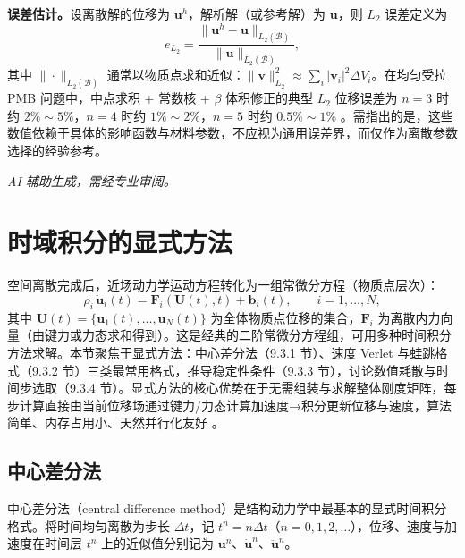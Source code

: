 \textbf{误差估计。}设离散解的位移为 $\mathbf{u}^{h}$，解析解（或参考解）为 $\mathbf{u}$，则 $L_2$ 误差定义为
\begin{equation}
  e_{L_2}=
  \frac{\|\mathbf{u}^{h}-\mathbf{u}\|_{L_2(\mathcal{B})}}
  {\|\mathbf{u}\|_{L_2(\mathcal{B})}},
  \label{eq:vol-l2-error}
\end{equation}
其中 $\|\cdot\|_{L_2(\mathcal{B})}$ 通常以物质点求和近似：$\|\mathbf{v}\|_{L_2}^2\approx\sum_i|\mathbf{v}_i|^2\Delta V_i$。在均匀受拉 PMB 问题中，中点求积 + 常数核 + $\beta$ 体积修正的典型 $L_2$ 位移误差为 $n=3$ 时约 $2\%\sim5\%$，$n=4$ 时约 $1\%\sim2\%$，$n=5$ 时约 $0.5\%\sim1\%$ \cite{SelesonLittlewood2016,LeBobaru2018}。需指出的是，这些数值依赖于具体的影响函数与材料参数，不应视为通用误差界，而仅作为离散参数选择的经验参考。

\emph{AI 辅助生成，需经专业审阅。}

\section{时域积分的显式方法}\label{sec:disc-explicit}

空间离散完成后，近场动力学运动方程转化为一组常微分方程（物质点层次）：
\begin{equation}
  \rho_i\,\ddot{\mathbf{u}}_i(t)=\mathbf{F}_i(\mathbf{U}(t),t)+\mathbf{b}_i(t),
  \qquad i=1,\dots,N,
  \label{eq:exp-semi-discrete}
\end{equation}
其中 $\mathbf{U}(t)=\{\mathbf{u}_1(t),\dots,\mathbf{u}_N(t)\}$ 为全体物质点位移的集合，$\mathbf{F}_i$ 为离散内力向量（由键力或力态求和得到）。这是经典的二阶常微分方程组，可用多种时间积分方法求解。本节聚焦于显式方法：中心差分法（9.3.1 节）、速度 Verlet 与蛙跳格式（9.3.2 节）三类最常用格式，推导稳定性条件（9.3.3 节），讨论数值耗散与时间步选取（9.3.4 节）。显式方法的核心优势在于无需组装与求解整体刚度矩阵，每步计算直接由当前位移场通过键力/力态计算加速度→积分更新位移与速度，算法简单、内存占用小、天然并行化友好 \cite{SillingAskari2005,Parks2008}。

\subsection{中心差分法}\label{sec:disc-central-difference}

中心差分法（central difference method）是结构动力学中最基本的显式时间积分格式。将时间均匀离散为步长 $\Delta t$，记 $t^n=n\Delta t$（$n=0,1,2,\dots$），位移、速度与加速度在时间层 $t^n$ 上的近似值分别记为 $\mathbf{u}^n$、$\dot{\mathbf{u}}^n$、$\ddot{\mathbf{u}}^n$。

